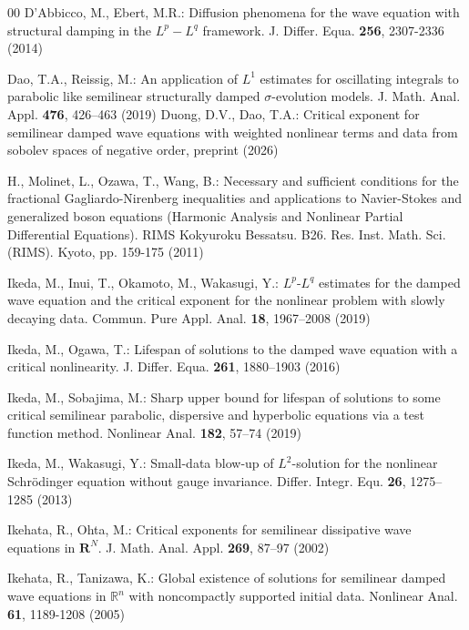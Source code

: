 \documentclass[11pt,reqno]{amsart}
\begin{document}
\begin{thebibliography}{00}
  D'Abbicco, M., Ebert, M.R.: Diffusion phenomena for the wave equation with structural damping in the $L^p-L^q$ framework. J. Differ. Equa. \textbf{256}, 2307-2336 (2014)

 Dao, T.A.,  Reissig, M.:  An application of $L^1$ estimates for oscillating integrals to parabolic like semilinear structurally damped $\sigma$-evolution models. J. Math. Anal. Appl. \textbf{476}, 426--463 (2019)
 Duong, D.V., Dao, T.A.: Critical exponent for semilinear damped wave equations with weighted nonlinear terms and data from sobolev spaces of negative order, preprint (2026)

 H., Molinet, L.,  Ozawa, T., Wang, B.: Necessary and sufficient conditions for the fractional Gagliardo-Nirenberg inequalities and applications to Navier-Stokes and generalized boson equations (Harmonic Analysis and Nonlinear Partial Differential Equations). RIMS Kokyuroku Bessatsu. B26. Res. Inst. Math. Sci. (RIMS). Kyoto,
pp. 159-175 (2011)

 Ikeda, M., Inui, T., Okamoto, M., Wakasugi, Y.: $L^p$-$L^q$ estimates for the damped wave equation and the critical exponent for the nonlinear problem with slowly decaying data. Commun. Pure Appl. Anal. \textbf{18}, 1967--2008 (2019)

  Ikeda, M.,  Ogawa, T.: Lifespan of solutions to the damped wave equation with a critical nonlinearity. J. Differ. Equa. \textbf{261}, 1880--1903 (2016)

 Ikeda, M., Sobajima, M.: Sharp upper bound for lifespan of solutions to some critical semilinear parabolic, dispersive and hyperbolic equations via a test function method. Nonlinear Anal. \textbf{182}, 57--74 (2019)

 Ikeda, M.,  Wakasugi, Y.: Small-data blow-up of $L^2$-solution for the nonlinear Schr\"odinger equation without gauge invariance. Differ. Integr. Equ. \textbf{26}, 1275--1285 (2013)

 Ikehata, R., Ohta, M.: Critical exponents for semilinear dissipative wave equations in $\mathbf{R}^N$. J. Math. Anal. Appl. \textbf{269}, 87--97 (2002)

 Ikehata, R., Tanizawa, K.: Global existence of solutions for semilinear damped
wave equations in $\mathbb{R}^n$ with noncompactly supported
initial data. Nonlinear Anal. \textbf{61}, 1189-1208 (2005)


\end{thebibliography}
\end{document}
